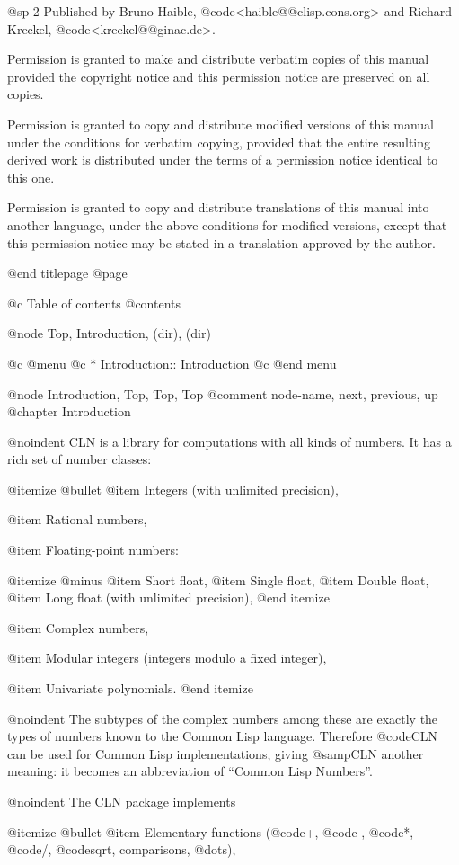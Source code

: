 @sp 2
Published by Bruno Haible, @code{<haible@@clisp.cons.org>} and
Richard Kreckel, @code{<kreckel@@ginac.de>}.

Permission is granted to make and distribute verbatim copies of
this manual provided the copyright notice and this permission notice
are preserved on all copies.

Permission is granted to copy and distribute modified versions of this
manual under the conditions for verbatim copying, provided that the entire
resulting derived work is distributed under the terms of a permission
notice identical to this one.

Permission is granted to copy and distribute translations of this manual
into another language, under the above conditions for modified versions,
except that this permission notice may be stated in a translation approved
by the author.

@end titlepage
@page


@c Table of contents
@contents


@node Top, Introduction, (dir), (dir)

@c @menu
@c * Introduction::                Introduction
@c @end menu


@node Introduction, Top, Top, Top
@comment node-name, next, previous, up
@chapter Introduction

@noindent
CLN is a library for computations with all kinds of numbers.
It has a rich set of number classes:

@itemize @bullet
@item
Integers (with unlimited precision),

@item
Rational numbers,

@item
Floating-point numbers:

@itemize @minus
@item
Short float,
@item
Single float,
@item
Double float,
@item
Long float (with unlimited precision),
@end itemize

@item
Complex numbers,

@item
Modular integers (integers modulo a fixed integer),

@item
Univariate polynomials.
@end itemize

@noindent
The subtypes of the complex numbers among these are exactly the
types of numbers known to the Common Lisp language. Therefore
@code{CLN} can be used for Common Lisp implementations, giving
@samp{CLN} another meaning: it becomes an abbreviation of
``Common Lisp Numbers''.

@noindent
The CLN package implements

@itemize @bullet
@item
Elementary functions (@code{+}, @code{-}, @code{*}, @code{/}, @code{sqrt},
comparisons, @dots{}),

